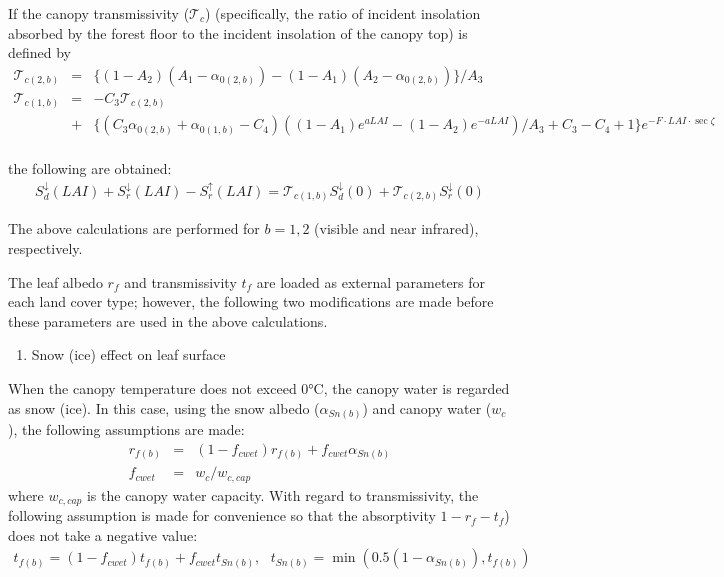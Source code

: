 If the canopy transmissivity (\({\mathcal{T}}_c\)) (specifically, the ratio of incident insolation absorbed by the forest floor to the incident insolation of the canopy top) is defined by \begin{eqnarray}
  {\mathcal{T}}_{c(2,b)} &=& \{ ( 1 - A_2 )( A_1 - \alpha_{0(2,b)} )
                      - ( 1 - A_1 )( A_2 - \alpha_{0(2,b)} ) \} / A_3 \\
 {\mathcal{T}}_{c(1,b)} &=& - C_3 {\mathcal{T}}_{c(2,b)}  \nonumber\\
 &+&                   \{ ( C_3 \alpha_{0(2,b)} + \alpha_{0(1,b)} -C_4 )
                   ( ( 1 - A_1 ) e^{ a LAI }
                   - ( 1 - A_2 ) e^{-a LAI } )  / A_3
                   + C_3 - C_4 +1 \} e^{- F\cdot LAI\cdot \sec\zeta} \nonumber\\
\end{eqnarray}

the following are obtained: \begin{eqnarray}
 S^{\downarrow}_d(LAI) + S^{\downarrow}_r(LAI) - S^{\uparrow}_r(LAI)
= {\mathcal{T}}_{c(1,b)} S^{\downarrow}_d(0)
+ {\mathcal{T}}_{c(2,b)} S^{\downarrow}_r(0)
\end{eqnarray}

The above calculations are performed for \(b=1, 2\) (visible and near infrared), respectively.

The leaf albedo \(r_f\) and transmissivity \(t_f\) are loaded as external parameters for each land cover type; however, the following two modifications are made before these parameters are used in the
above calculations.

\begin{enumerate}
\def\labelenumi{\arabic{enumi}.}
\tightlist
\item
  Snow (ice) effect on leaf surface
\end{enumerate}

When the canopy temperature does not exceed 0°C, the canopy water is regarded as snow (ice). In this case, using the snow albedo (\(\alpha_{Sn(b)}\)) and canopy water (\(w_c\)), the following
assumptions are made: \begin{eqnarray}
 r_{f(b)} &=& ( 1 - f_{cwet} ) r_{f(b)}
         + f_{cwet} \alpha_{Sn(b)} \\
  f_{cwet} &=& {w_c}/w_{c,cap}
\end{eqnarray} where \(w_{c,cap}\) is the canopy water capacity. With regard to transmissivity, the following assumption is made for convenience so that the absorptivity \(1-r_f-t_f\)) does not take a negative
value: \begin{eqnarray}
 t_{f(b)} = ( 1 - f_{cwet} ) t_{f(b)}
         + f_{cwet} t_{Sn(b)}, \ \ \
 t_{Sn(b)} = \min( 0.5(1 - \alpha_{Sn(b)}), t_{f(b)} )
\end{eqnarray}


